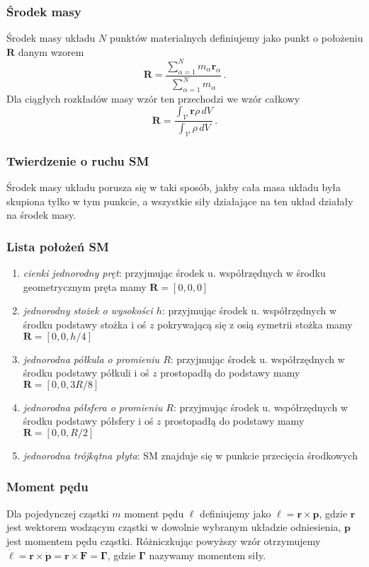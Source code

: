 \documentclass[../main.tex]{subfiles}
\begin{document}
\subsubsection{Środek masy}
Środek masy układu \(N\) punktów materialnych definiujemy jako punkt o położeniu \(\mathbf{R}\)
danym wzorem
\begin{equation*}
    \mathbf{R}=\frac{\sum_{\alpha=1}^Nm_\alpha\mathbf{r}_\alpha}{\sum_{\alpha=1}^Nm_\alpha}\,.
\end{equation*}
Dla ciągłych rozkładów masy wzór ten przechodzi we wzór całkowy
\begin{equation*}
    \mathbf{R}=\frac{\int_{\mathcal{V}} \mathbf{r}\rho\,dV}{\int_{\mathcal{V}} \rho\,dV}\,.
\end{equation*}
\subsubsection*{Twierdzenie o ruchu SM}
Środek masy układu porusza się w taki sposób, jakby cała masa układu była skupiona tylko w tym
punkcie, a wszystkie siły działające na ten układ działały na środek masy.

\subsubsection*{Lista położeń SM}

\begin{enumerate}
    \item \textit{cienki jednorodny pręt}: przyjmując środek u. współrzędnych w środku geometrycznym
    pręta mamy \(\mathbf{R}=[0,0,0]\)
    \item \textit{jednorodny stożek o wysokości \(h\)}: przyjmując środek u. współrzędnych w środku
    podstawy stożka i oś \(z\) pokrywającą się z osią symetrii stożka mamy \(\mathbf{R}=[0,0,h/4]\)
    \item \textit{jednorodna półkula o promieniu \(R\)}: przyjmując środek u. współrzędnych w środku
    podstawy półkuli i oś \(z\) prostopadłą do podstawy mamy \(\mathbf{R}=[0,0,3R/8]\)
    \item \textit{jednorodna półsfera o promieniu \(R\)}: przyjmując środek u. współrzędnych w
    środku podstawy półsfery i oś \(z\) prostopadłą do podstawy mamy \(\mathbf{R}=[0,0,R/2]\)
    \item \textit{jednorodna trójkątna płyta}: SM znajduje się w punkcie przecięcia środkowych
\end{enumerate}
\subsubsection{Moment pędu}
Dla pojedynczej cząstki \(m\) moment pędu \(\boldsymbol\ell\) definiujemy jako
\(\boldsymbol{\ell}=\mathbf{r}\times\mathbf{p}\), gdzie \(\mathbf{r}\) jest wektorem wodzącym
cząstki w dowolnie wybranym układzie odniesienia, \(\mathbf{p}\) jest momentem pędu cząstki.
Różniczkując powyższy wzór otrzymujemy
\(\dot{\boldsymbol{\ell}}=\mathbf{r}\times\dot{\mathbf{p}}=\mathbf{r}\times\mathbf{F}=\boldsymbol{\Gamma}\),
gdzie \(\boldsymbol{\Gamma}\) nazywamy momentem siły.
\end{document}
